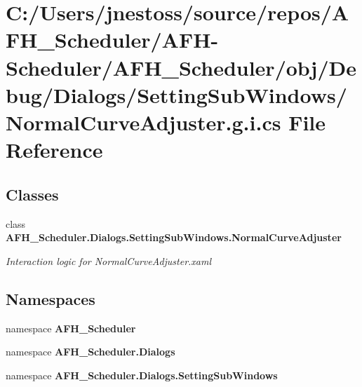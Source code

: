 \section{C\+:/\+Users/jnestoss/source/repos/\+A\+F\+H\+\_\+\+Scheduler/\+A\+F\+H-\/\+Scheduler/\+A\+F\+H\+\_\+\+Scheduler/obj/\+Debug/\+Dialogs/\+Setting\+Sub\+Windows/\+Normal\+Curve\+Adjuster.g.\+i.\+cs File Reference}
\label{_debug_2_dialogs_2_setting_sub_windows_2_normal_curve_adjuster_8g_8i_8cs}
\subsection*{Classes}
\begin{DoxyCompactItemize}
\item 
class \textbf{ A\+F\+H\+\_\+\+Scheduler.\+Dialogs.\+Setting\+Sub\+Windows.\+Normal\+Curve\+Adjuster}
\begin{DoxyCompactList}\small\item\em Interaction logic for Normal\+Curve\+Adjuster.\+xaml \end{DoxyCompactList}\end{DoxyCompactItemize}
\subsection*{Namespaces}
\begin{DoxyCompactItemize}
\item 
namespace \textbf{ A\+F\+H\+\_\+\+Scheduler}
\item 
namespace \textbf{ A\+F\+H\+\_\+\+Scheduler.\+Dialogs}
\item 
namespace \textbf{ A\+F\+H\+\_\+\+Scheduler.\+Dialogs.\+Setting\+Sub\+Windows}
\end{DoxyCompactItemize}
